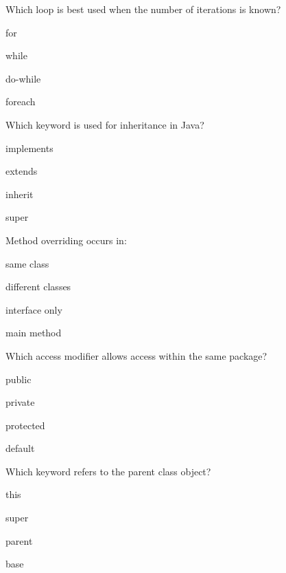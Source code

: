 \documentclass{CWNUExam}
\begin{document}
\begin{question}
Which loop is best used when the number of iterations is known?
\paren
\begin{choices}
\item for
\item while
\item do-while
\item foreach
\end{choices}
\end{question}

\begin{question}
Which keyword is used for inheritance in Java?
\paren
\begin{choices}
\item implements
\item extends
\item inherit
\item super
\end{choices}
\end{question}

\begin{question}
Method overriding occurs in:
\paren
\begin{choices}
\item same class
\item different classes
\item interface only
\item main method
\end{choices}
\end{question}

\begin{question}
Which access modifier allows access within the same package?
\paren
\begin{choices}
\item public
\item private
\item protected
\item default
\end{choices}
\end{question}

\begin{question}
Which keyword refers to the parent class object?
\paren
\begin{choices}
\item this
\item super
\item parent
\item base
\end{choices}
\end{question}
\end{document}
